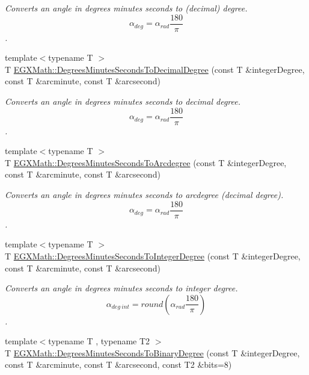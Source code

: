\begin{DoxyCompactItemize}
\begin{DoxyCompactList}\small\item\em Converts an angle in degrees minutes seconds to (decimal) degree. \[\alpha_{deg}=\alpha_{rad}\frac{180}{\pi}\]. \end{DoxyCompactList}\item 
{\footnotesize template$<$typename T $>$ }\\T \mbox{\hyperlink{group___e_g_x_math-_conversions-_angle_conversions-_degrees_minutes_seconds_gab4d4c25623f86611692c39eb29f16141}{E\+G\+X\+Math\+::\+Degrees\+Minutes\+Seconds\+To\+Decimal\+Degree}} (const T \&integer\+Degree, const T \&arcminute, const T \&arcsecond)
\begin{DoxyCompactList}\small\item\em Converts an angle in degrees minutes seconds to decimal degree. \[\alpha_{deg}=\alpha_{rad}\frac{180}{\pi}\]. \end{DoxyCompactList}\item 
{\footnotesize template$<$typename T $>$ }\\T \mbox{\hyperlink{group___e_g_x_math-_conversions-_angle_conversions-_degrees_minutes_seconds_ga71fd0a3b9238a3a4fde150802938dee8}{E\+G\+X\+Math\+::\+Degrees\+Minutes\+Seconds\+To\+Arcdegree}} (const T \&integer\+Degree, const T \&arcminute, const T \&arcsecond)
\begin{DoxyCompactList}\small\item\em Converts an angle in degrees minutes seconds to arcdegree (decimal degree). \[\alpha_{deg}=\alpha_{rad}\frac{180}{\pi}\]. \end{DoxyCompactList}\item 
{\footnotesize template$<$typename T $>$ }\\T \mbox{\hyperlink{group___e_g_x_math-_conversions-_angle_conversions-_degrees_minutes_seconds_ga973287a878e521e3c1d4d1f973ecdcfe}{E\+G\+X\+Math\+::\+Degrees\+Minutes\+Seconds\+To\+Integer\+Degree}} (const T \&integer\+Degree, const T \&arcminute, const T \&arcsecond)
\begin{DoxyCompactList}\small\item\em Converts an angle in degrees minutes seconds to integer degree. \[\alpha_{deg\ int}=round(\alpha_{rad}\frac{180}{\pi})\]. \end{DoxyCompactList}\item 
{\footnotesize template$<$typename T , typename T2 $>$ }\\T \mbox{\hyperlink{group___e_g_x_math-_conversions-_angle_conversions-_degrees_minutes_seconds_ga838c47916ce872cab2dfecd5ccf0a6ee}{E\+G\+X\+Math\+::\+Degrees\+Minutes\+Seconds\+To\+Binary\+Degree}} (const T \&integer\+Degree, const T \&arcminute, const T \&arcsecond, const T2 \&bits=8)

\end{DoxyCompactItemize}
